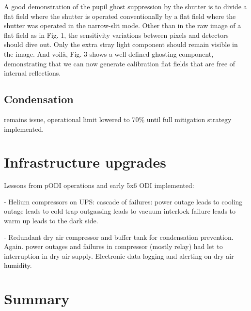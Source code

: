 \documentclass[]{spieman}
\begin{document}
A good demonstration of the pupil ghost suppression by the shutter is to
divide a flat field where the shutter is operated conventionally by a flat
field where the shutter was operated in the narrow-slit mode. Other than in
the raw image of a flat field as in Fig. 1, the sensitivity variations
between pixels and detectors should dive out. Only the extra stray light
component should remain visible in the image. And voilà, Fig. 3 shows a
well-defined ghosting component, demonstrating that we can now generate
calibration flat fields that are free of internal reflections.


\subsection{Condensation}

remains issue, operational limit lowered to 70\% until full mitigation
strategy implemented.



\section{Infrastructure upgrades}

Lessons from pODI operations and early 5x6 ODI implemented:

- Helium compressors on UPS: cascade of failures: power outage leads to cooling outage leads to 
cold trap outgassing leads to vacuum interlock failure leads to warm up leads to the dark side. 

- Redundant dry air compressor and buffer tank for condensation prevention. Again. power outages 
and failures in compressor (mostly relay) had let to interruption in dry air supply.  Electronic 
data logging and alerting on dry air humidity.




\section{Summary}


 

\end{document}
